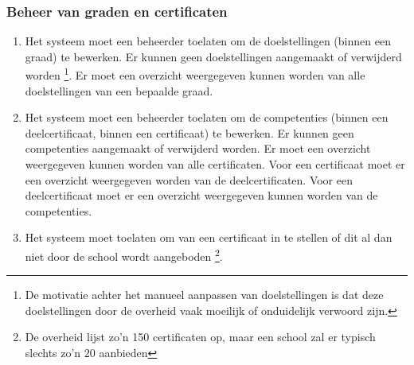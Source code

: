 \documentclass[a4paper]{article}
\begin{document}
\subsubsection{Beheer van graden en certificaten}
\begin{enumerate}[label=F\arabic*,resume]
\item Het systeem moet een beheerder toelaten om de doelstellingen (binnen een graad) te bewerken. Er kunnen geen doelstellingen aangemaakt of verwijderd worden \footnote{De motivatie achter het manueel aanpassen van doelstellingen is dat deze doelstellingen door de overheid vaak moeilijk of onduidelijk verwoord zijn.}. Er moet een overzicht weergegeven kunnen worden van alle doelstellingen van een bepaalde graad.
\item Het systeem moet een beheerder toelaten om de competenties (binnen een deelcertificaat, binnen een certificaat) te bewerken. Er kunnen geen competenties aangemaakt of verwijderd worden. Er moet een overzicht weergegeven kunnen worden van alle certificaten. Voor een certificaat moet er een overzicht weergegeven worden van de deelcertificaten. Voor een deelcertificaat moet er een overzicht weergegeven kunnen worden van de competenties.
\item Het systeem moet toelaten om van een certificaat in te stellen of dit al dan niet door de school wordt aangeboden \footnote{De overheid lijst zo'n 150 certificaten op, maar een school zal er typisch slechts zo'n $20$ aanbieden}.
\end{enumerate}
\end{document}
